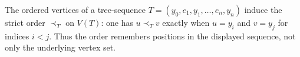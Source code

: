 \begin{definition}
The ordered vertices of a tree-sequence
$T=(y_0,e_1,y_1,\ldots,e_n,y_n)$ induce the strict order $\prec_T$ on
$V(T)$: one has $u\prec_T v$ exactly when $u=y_i$ and $v=y_j$ for indices
$i<j$.  Thus the order remembers positions in the displayed sequence, not
only the underlying vertex set.
\end{definition}
